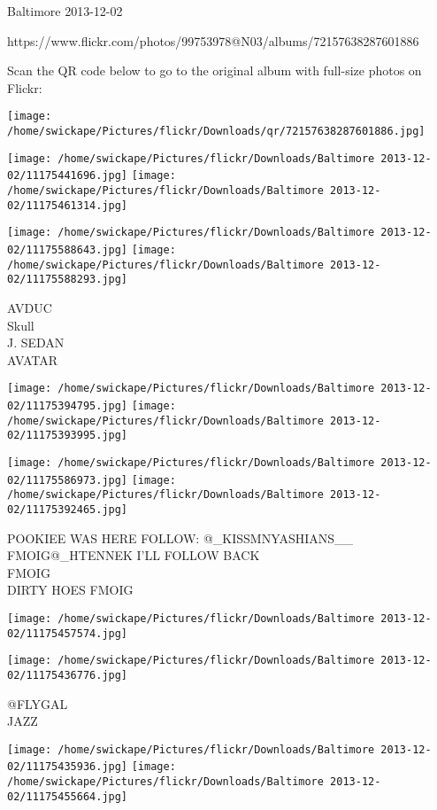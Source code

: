 \documentclass[10pt,letterpaper]{article}
\begin{document}
Baltimore 2013-12-02

https://www.flickr.com/photos/99753978@N03/albums/72157638287601886

Scan the QR code below to go to the original album with full-size photos on Flickr:

\texttt{[image: /home/swickape/Pictures/flickr/Downloads/qr/72157638287601886.jpg]}
\pagebreak

\texttt{[image: /home/swickape/Pictures/flickr/Downloads/Baltimore 2013-12-02/11175441696.jpg]}
\texttt{[image: /home/swickape/Pictures/flickr/Downloads/Baltimore 2013-12-02/11175461314.jpg]}

\texttt{[image: /home/swickape/Pictures/flickr/Downloads/Baltimore 2013-12-02/11175588643.jpg]}
\texttt{[image: /home/swickape/Pictures/flickr/Downloads/Baltimore 2013-12-02/11175588293.jpg]}

AVDUC\\
Skull\\
J. SEDAN\\
AVATAR\\
\pagebreak

\texttt{[image: /home/swickape/Pictures/flickr/Downloads/Baltimore 2013-12-02/11175394795.jpg]}
\texttt{[image: /home/swickape/Pictures/flickr/Downloads/Baltimore 2013-12-02/11175393995.jpg]}

\texttt{[image: /home/swickape/Pictures/flickr/Downloads/Baltimore 2013-12-02/11175586973.jpg]}
\texttt{[image: /home/swickape/Pictures/flickr/Downloads/Baltimore 2013-12-02/11175392465.jpg]}

POOKIEE WAS HERE FOLLOW: @\_KISSMNYASHIANS\_\_\\
FMOIG@\_HTENNEK I'LL FOLLOW BACK\\
FMOIG\\
DIRTY HOES FMOIG\\
\pagebreak

\texttt{[image: /home/swickape/Pictures/flickr/Downloads/Baltimore 2013-12-02/11175457574.jpg]}

\vspace{0.25in}
\texttt{[image: /home/swickape/Pictures/flickr/Downloads/Baltimore 2013-12-02/11175436776.jpg]}

@FLYGAL\\
JAZZ\\
\pagebreak

\texttt{[image: /home/swickape/Pictures/flickr/Downloads/Baltimore 2013-12-02/11175435936.jpg]}
\texttt{[image: /home/swickape/Pictures/flickr/Downloads/Baltimore 2013-12-02/11175455664.jpg]}
\end{document}
